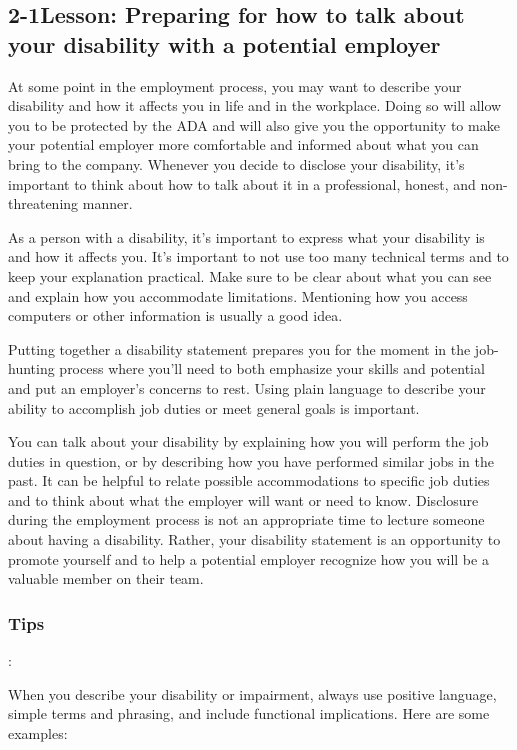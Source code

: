 \pagebreak \subsection*{2-1\quad Lesson: Preparing for how to talk about your disability with a potential employer}
At some point in the employment process, you may want to describe your disability and how it affects you in life and in the workplace. Doing so will allow you to be protected by the ADA and will also give you the opportunity to make your potential employer more comfortable and informed about what you can bring to the company. Whenever you decide to disclose your disability, it's important to think about how to talk about it in a professional, honest, and non-threatening manner.

As a person with a disability, it's important to express what your disability is and how it affects you. It's important to not use too many technical terms and to keep your explanation practical. Make sure to be clear about what you can see and explain how you accommodate limitations. Mentioning how you access computers or other information is usually a good idea.

Putting together a disability statement prepares you for the moment in the job-hunting process where you'll need to both emphasize your skills and potential and put an employer's concerns to rest. Using plain language to describe your ability to accomplish job duties or meet general goals is important.

You can talk about your disability by explaining how you will perform the job duties in question, or by describing how you have performed similar jobs in the past. It can be helpful to relate possible accommodations to specific job duties and to think about what the employer will want or need to know. Disclosure during the employment process is not an appropriate time to lecture someone about having a
disability. Rather, your disability statement is an opportunity to promote yourself and to help a potential employer recognize how you will be a valuable member on their team.

\subsubsection*{Tips}:

When you describe your disability or impairment, always use positive language, simple terms and phrasing, and include functional implications. Here are some examples:

